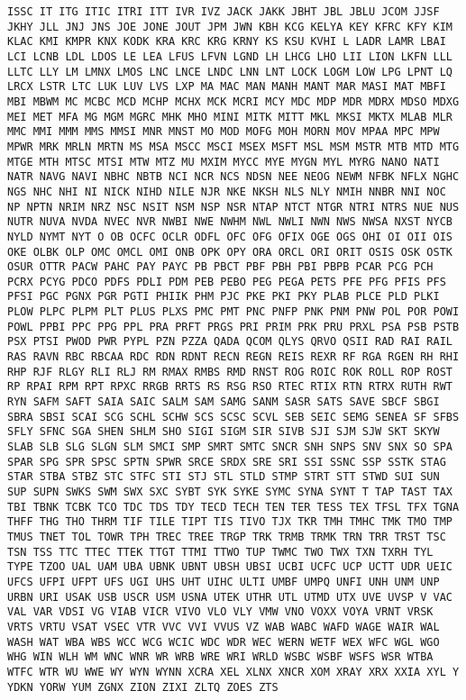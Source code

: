 \documentclass[11pt]{article}
\begin{document}
\begin{Verbatim}[commandchars=\\\{\}]
ISSC IT ITG ITIC ITRI ITT IVR IVZ JACK JAKK JBHT JBL JBLU JCOM JJSF JKHY JLL JNJ JNS JOE JONE JOUT JPM JWN KBH KCG KELYA KEY KFRC KFY KIM KLAC KMI KMPR KNX KODK KRA KRC KRG KRNY KS KSU KVHI L LADR LAMR LBAI LCI LCNB LDL LDOS LE LEA LFUS LFVN LGND LH LHCG LHO LII LION LKFN LLL LLTC LLY LM LMNX LMOS LNC LNCE LNDC LNN LNT LOCK LOGM LOW LPG LPNT LQ LRCX LSTR LTC LUK LUV LVS LXP MA MAC MAN MANH MANT MAR MASI MAT MBFI MBI MBWM MC MCBC MCD MCHP MCHX MCK MCRI MCY MDC MDP MDR MDRX MDSO MDXG MEI MET MFA MG MGM MGRC MHK MHO MINI MITK MITT MKL MKSI MKTX MLAB MLR MMC MMI MMM MMS MMSI MNR MNST MO MOD MOFG MOH MORN MOV MPAA MPC MPW MPWR MRK MRLN MRTN MS MSA MSCC MSCI MSEX MSFT MSL MSM MSTR MTB MTD MTG MTGE MTH MTSC MTSI MTW MTZ MU MXIM MYCC MYE MYGN MYL MYRG NANO NATI NATR NAVG NAVI NBHC NBTB NCI NCR NCS NDSN NEE NEOG NEWM NFBK NFLX NGHC NGS NHC NHI NI NICK NIHD NILE NJR NKE NKSH NLS NLY NMIH NNBR NNI NOC NP NPTN NRIM NRZ NSC NSIT NSM NSP NSR NTAP NTCT NTGR NTRI NTRS NUE NUS NUTR NUVA NVDA NVEC NVR NWBI NWE NWHM NWL NWLI NWN NWS NWSA NXST NYCB NYLD NYMT NYT O OB OCFC OCLR ODFL OFC OFG OFIX OGE OGS OHI OI OII OIS OKE OLBK OLP OMC OMCL OMI ONB OPK OPY ORA ORCL ORI ORIT OSIS OSK OSTK OSUR OTTR PACW PAHC PAY PAYC PB PBCT PBF PBH PBI PBPB PCAR PCG PCH PCRX PCYG PDCO PDFS PDLI PDM PEB PEBO PEG PEGA PETS PFE PFG PFIS PFS PFSI PGC PGNX PGR PGTI PHIIK PHM PJC PKE PKI PKY PLAB PLCE PLD PLKI PLOW PLPC PLPM PLT PLUS PLXS PMC PMT PNC PNFP PNK PNM PNW POL POR POWI POWL PPBI PPC PPG PPL PRA PRFT PRGS PRI PRIM PRK PRU PRXL PSA PSB PSTB PSX PTSI PWOD PWR PYPL PZN PZZA QADA QCOM QLYS QRVO QSII RAD RAI RAIL RAS RAVN RBC RBCAA RDC RDN RDNT RECN REGN REIS REXR RF RGA RGEN RH RHI RHP RJF RLGY RLI RLJ RM RMAX RMBS RMD RNST ROG ROIC ROK ROLL ROP ROST RP RPAI RPM RPT RPXC RRGB RRTS RS RSG RSO RTEC RTIX RTN RTRX RUTH RWT RYN SAFM SAFT SAIA SAIC SALM SAM SAMG SANM SASR SATS SAVE SBCF SBGI SBRA SBSI SCAI SCG SCHL SCHW SCS SCSC SCVL SEB SEIC SEMG SENEA SF SFBS SFLY SFNC SGA SHEN SHLM SHO SIGI SIGM SIR SIVB SJI SJM SJW SKT SKYW SLAB SLB SLG SLGN SLM SMCI SMP SMRT SMTC SNCR SNH SNPS SNV SNX SO SPA SPAR SPG SPR SPSC SPTN SPWR SRCE SRDX SRE SRI SSI SSNC SSP SSTK STAG STAR STBA STBZ STC STFC STI STJ STL STLD STMP STRT STT STWD SUI SUN SUP SUPN SWKS SWM SWX SXC SYBT SYK SYKE SYMC SYNA SYNT T TAP TAST TAX TBI TBNK TCBK TCO TDC TDS TDY TECD TECH TEN TER TESS TEX TFSL TFX TGNA THFF THG THO THRM TIF TILE TIPT TIS TIVO TJX TKR TMH TMHC TMK TMO TMP TMUS TNET TOL TOWR TPH TREC TREE TRGP TRK TRMB TRMK TRN TRR TRST TSC TSN TSS TTC TTEC TTEK TTGT TTMI TTWO TUP TWMC TWO TWX TXN TXRH TYL TYPE TZOO UAL UAM UBA UBNK UBNT UBSH UBSI UCBI UCFC UCP UCTT UDR UEIC UFCS UFPI UFPT UFS UGI UHS UHT UIHC ULTI UMBF UMPQ UNFI UNH UNM UNP URBN URI USAK USB USCR USM USNA UTEK UTHR UTL UTMD UTX UVE UVSP V VAC VAL VAR VDSI VG VIAB VICR VIVO VLO VLY VMW VNO VOXX VOYA VRNT VRSK VRTS VRTU VSAT VSEC VTR VVC VVI VVUS VZ WAB WABC WAFD WAGE WAIR WAL WASH WAT WBA WBS WCC WCG WCIC WDC WDR WEC WERN WETF WEX WFC WGL WGO WHG WIN WLH WM WNC WNR WR WRB WRE WRI WRLD WSBC WSBF WSFS WSR WTBA WTFC WTR WU WWE WY WYN WYNN XCRA XEL XLNX XNCR XOM XRAY XRX XXIA XYL Y YDKN YORW YUM ZGNX ZION ZIXI ZLTQ ZOES ZTS 
    \end{Verbatim}
\end{document}
